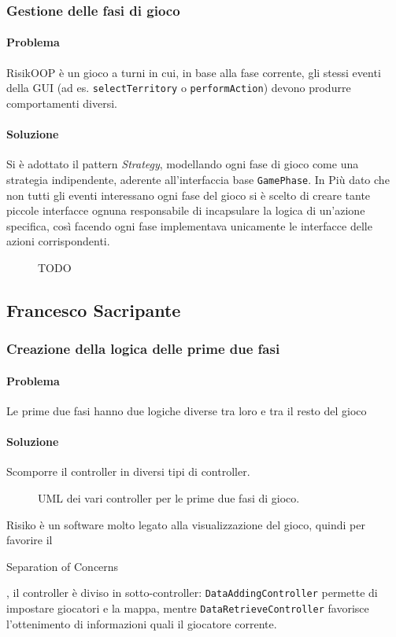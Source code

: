 \documentclass[a4paper,12pt]{report}
\begin{document}
\subsubsection{Gestione delle fasi di gioco}
\paragraph{Problema}
RisikOOP è un gioco a turni in cui, in base alla fase corrente, gli stessi eventi della GUI (ad es. \texttt{selectTerritory} o \texttt{performAction}) devono produrre comportamenti diversi.
\paragraph{Soluzione}
Si è adottato il pattern \textit{Strategy}, modellando ogni fase di gioco come una strategia indipendente, aderente all'interfaccia base \texttt{GamePhase}.
In Più dato che non tutti gli eventi interessano ogni fase del gioco si è scelto di creare tante piccole interfacce ognuna responsabile di incapsulare la logica di un'azione specifica, così facendo ogni fase implementava unicamente le interfacce delle azioni corrispondenti.
\begin{figure}[H]
	\centering
	
	\caption{TODO}
\end{figure}
\subsection{Francesco Sacripante}
\subsubsection{Creazione della logica delle prime due fasi}
\paragraph{Problema}
Le prime due fasi hanno due logiche diverse tra loro e tra il resto del gioco
\paragraph{Soluzione}
Scomporre il controller in diversi tipi di controller.
\begin{figure}[H]
	\centering
	
	\caption{UML dei vari controller per le prime due fasi di gioco.}
\end{figure}
Risiko è un software molto legato alla visualizzazione del gioco, quindi per favorire il \begin{itshape}Separation of Concerns\end{itshape}, il controller è diviso in sotto-controller: \texttt{DataAddingController} permette di impostare giocatori e la mappa, mentre \texttt{DataRetrieveController} favorisce l'ottenimento di informazioni quali il giocatore corrente.
\end{document}
